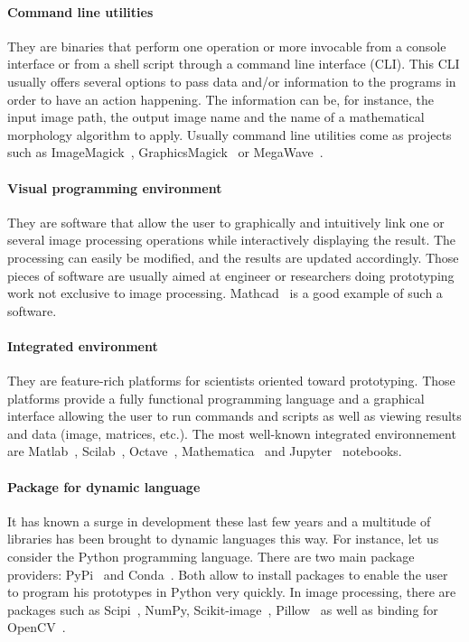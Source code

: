 \paragraph{Command line utilities} They are binaries that perform one operation or more invocable from a console
interface or from a shell script through a command line interface (CLI). This CLI usually offers several options to pass
data and/or information to the programs in order to have an action happening. The information can be, for instance, the
input image path, the output image name and the name of a mathematical morphology algorithm to apply. Usually command
line utilities come as projects such as ImageMagick~\parencite{imagemagick.2021},
GraphicsMagick~\parencite{graphicsmagick.2021} or MegaWave~\parencite{froment.2012.megawave,froment.2004.megawave2}.

\paragraph{Visual programming environment} They are software that allow the user to graphically and intuitively link one
or several image processing operations while interactively displaying the result. The processing can easily be modified,
and the results are updated accordingly. Those pieces of software are usually aimed at engineer or researchers doing
prototyping work not exclusive to image processing. Mathcad~\parencite{ptc.2019.mathcad} is a good example of such a
software.

\paragraph{Integrated environment} They are feature-rich platforms for scientists oriented toward prototyping. Those
platforms provide a fully functional programming language and a graphical interface allowing the user to run commands
and scripts as well as viewing results and data (image, matrices, etc.). The most well-known integrated environnement
are Matlab~\parencite{mathworks.2020.matlab}, Scilab~\parencite{scilab.2020}, Octave~\parencite{gnu.2021.octave},
Mathematica~\parencite{wolfram.2020.mathematica} and Jupyter~\parencite{kluyver.2016.jupyter} notebooks.

\paragraph{Package for dynamic language} It has known a surge in development these last few years and a multitude of
libraries has been brought to dynamic languages this way. For instance, let us consider the Python programming language.
There are two main package providers: PyPi~\parencite{pypi.2021} and Conda~\parencite{anaconda.2020}. Both allow to
install packages to enable the user to program his prototypes in Python very quickly. In image processing, there are
packages such as Scipi~\parencite{jones.2006.scipy}, NumPy, Scikit-image~\parencite{vanderwalt.2014.skimage},
Pillow~\parencite{clark.2021.pillow} as well as binding for OpenCV~\parencite{bradski.2000.opencv}.

